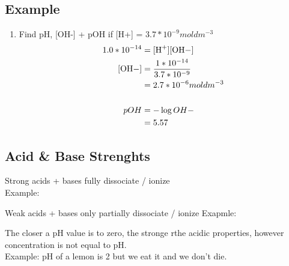 \documentclass{article}
\begin{document}
\subsection{Example}
\begin{enumerate}
    \item Find pH, [OH-] + pOH if [H+] = $3.7*10^{-9}moldm^{-3}$\begin{align*}
        1.0*10^{-14} &= \ce{[H+][OH-]}\\
        \ce{[OH-]} &= \frac{1*10^{-14}}{3.7*10^{-9}}\\
        &= 2.7*10^{-6}moldm^{-3}\\
        &\\
        pOH &= -\log{OH-}\\
        &= 5.57
    \end{align*}
\end{enumerate}

\subsection{Acid \& Base Strenghts}
Strong acids + bases fully dissociate / ionize\\
Example:  \\

Weak acids + bases only partially dissociate / ionize
Exapmle:  \\

The closer a pH value is to zero, the stronge rthe acidic properties, however concentration is not equal to pH. \\
Example: pH of a lemon is 2 but we eat it and we don't die.
\end{document}
